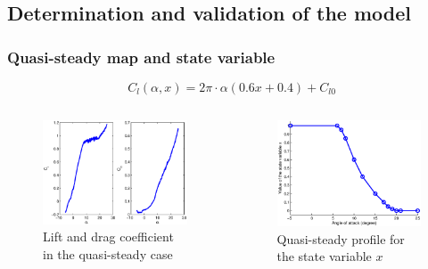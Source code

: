 \documentclass[compress]{beamer}
\begin{document}
\subsection{Determination and validation of the model}

\begin{frame}
  \frametitle{Quasi-steady map and state variable}
\begin{equation*}
  C_l(\alpha,x)=2 \pi \cdot \alpha (0.6 x + 0.4) + C_{l0}
\end{equation*}
  \begin{columns}
    \begin{figure}[h]
      \begin{center}
	\includegraphics[width=1\textwidth]{./Figures/Cd_and_Cl_NACA0009.eps}
      \end{center}
      \caption{Lift and drag coefficient in the quasi-steady case}
    \end{figure}
    \begin{figure}[ht]
      \begin{center}
	\includegraphics[width=1\textwidth]{./Figures/x_0_vs_alpha.eps}
      \end{center}
      \caption{Quasi-steady profile for the state variable $x$}
    \end{figure}
  \end{columns}
\end{frame}
\end{document}
